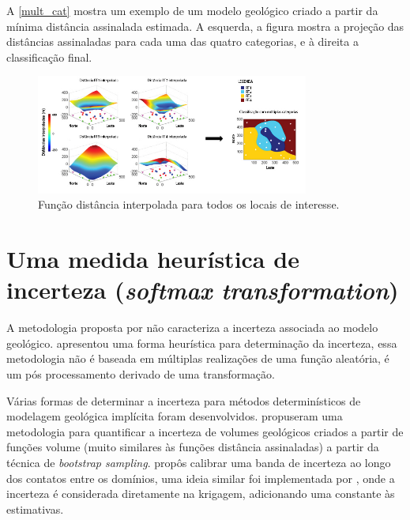 A \autoref{mult_cat} mostra um exemplo de um modelo geológico criado a partir da mínima distância assinalada estimada. A esquerda, a figura mostra a projeção das distâncias assinaladas para cada uma das quatro categorias, e à direita a classificação final.

\begin{figure}[!ht]
	\caption{\label{mult_cat}Função distância interpolada para todos os locais de interesse.}
	\begin{center}
		\includegraphics[width=0.8\textwidth]{modelagem_geologica/mult_cat_legenda}
	\end{center}
\end{figure}

\section{Uma medida heurística de incerteza (\textit{softmax transformation})}\label{softmax_chap}

A metodologia proposta por  não caracteriza a incerteza associada ao modelo geológico.  apresentou uma forma heurística para determinação da incerteza, essa metodologia não é baseada em múltiplas realizações de uma função aleatória, é um pós processamento derivado de uma transformação.

Várias formas de determinar a incerteza para métodos determinísticos de modelagem geológica implícita foram desenvolvidos.  propuseram uma metodologia para quantificar a incerteza de volumes geológicos criados a partir de funções volume (muito similares às funções distância assinaladas) a partir da técnica de \textit{bootstrap sampling}.  propôs calibrar uma banda de incerteza ao longo dos contatos entre os domínios, uma ideia similar foi implementada por , onde a incerteza é considerada diretamente na krigagem, adicionando uma constante às estimativas.

